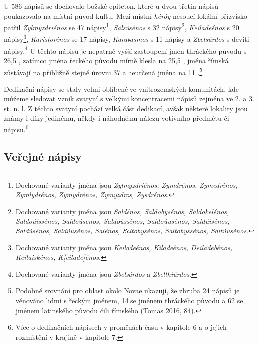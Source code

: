 U 586 nápisů se dochovalo božské epiteton, které u dvou třetin nápisů poukazovalo na místní původ kultu. Mezi místní {\em héróy} nesoucí lokální přízvisko patřil {\em Zylmyzdriénos} se 47 nápisy\footnote{Dochované varianty jména jsou {\em Zylmyzdriénos, Zymdrénos, Zymedrénos, Zymlydrénos, Zymydrénos, Zymyzdros, Zysdrénos}.}, {\em Salsúsénos} s 32 nápisy\footnote{Dochované varianty jména jsou {\em Saldénos, Saldobysénos, Saldokelénos, Saldoúissénos, Saldoúsenos, Saldoússénos, Saldoúusénos, Saldúisénos, Saldúsénos, Saldúusénos, Salénos, Saltobysénos, Saltobyssénos, Saltúusénos}.}, {\em Keiladeénos} s 20 nápisy\footnote{Dochované varianty jména jsou {\em Keiladeénos, Kiladeénos, Deiladebénos, Keilaiskénos, K{[}eilade{]}énos}.}, {\em Karistorénos} se 17 nápisy, {\em Karabasmos} s 11 nápisy a {\em Zbelsúrdos} s devíti nápisy.\footnote{Dochované varianty jména jsou {\em Zbelsúrdos} a {\em Zbelthiúrdos}.} U těchto nápisů je nepatrně vyšší zastoupení jmen thráckého původu s 26,5 , zatímco jména řeckého původu mírně klesla na 25,5 , jména římská zůstávají na přibližně stejné úrovni 37  a neurčená jména na 11 .\footnote{Podobné srovnání pro oblast okolo Novae ukazují, že zhruba 24  nápisů je věnováno lidmi s řeckým jménem, 14  se jménem thráckého původu a 62  se jménem latinského původu čili římského (Tomas 2016, 84).}

Dedikační nápisy se staly velmi oblíbené ve vnitrozemských komunitách, kde můžeme sledovat vznik svatyní s velkými koncentracemi nápisů zejména ve 2. a 3. st. n. l. Z těchto svatyní pochází velká část dedikací, avšak některé lokality jsou známy i díky jedinému, někdy i náhodnému nálezu votivního předmětu či nápisu.\footnote{Více o dedikačních nápisech v proměnách času v kapitole 6 a o jejich rozmístění v krajině v kapitole 7.}

\subsection[veřejné-nápisy]{Veřejné nápisy}

